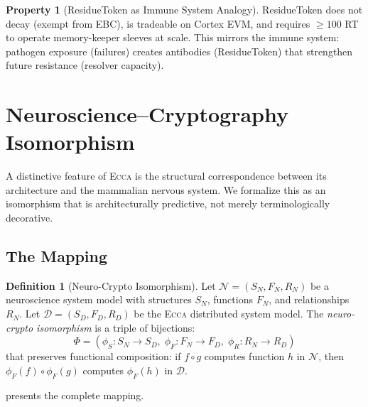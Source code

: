 \documentclass[11pt,twocolumn]{article}
\theoremstyle{definition}
\newtheorem{definition}{Definition}[section]
\newtheorem{property}{Property}[section]
\theoremstyle{plain}
\theoremstyle{remark}
\newcommand{\ecca}{\textsc{Ecca}}
\begin{document}
\begin{property}[ResidueToken as Immune System Analogy]
ResidueToken does not decay (exempt from EBC), is tradeable on Cortex EVM, and requires $\geq 100$ RT to operate memory-keeper sleeves at scale. This mirrors the immune system: pathogen exposure (failures) creates antibodies (ResidueToken) that strengthen future resistance (resolver capacity).
\end{property}

\section{Neuroscience--Cryptography Isomorphism}\label{sec:neuro-iso}

A distinctive feature of \ecca{} is the structural correspondence between its architecture and the mammalian nervous system. We formalize this as an isomorphism that is architecturally predictive, not merely terminologically decorative.

\subsection{The Mapping}

\begin{definition}[Neuro-Crypto Isomorphism]\label{def:iso}
Let $\mathcal{N} = (S_N, F_N, R_N)$ be a neuroscience system model with structures $S_N$, functions $F_N$, and relationships $R_N$. Let $\mathcal{D} = (S_D, F_D, R_D)$ be the \ecca{} distributed system model. The \emph{neuro-crypto isomorphism} is a triple of bijections:
\begin{equation}
  \Phi = (\phi_S : S_N \to S_D,\; \phi_F : F_N \to F_D,\; \phi_R : R_N \to R_D)
\end{equation}
that preserves functional composition: if $f \circ g$ computes function $h$ in $\mathcal{N}$, then $\phi_F(f) \circ \phi_F(g)$ computes $\phi_F(h)$ in $\mathcal{D}$.
\end{definition}

 presents the complete mapping.
\end{document}
